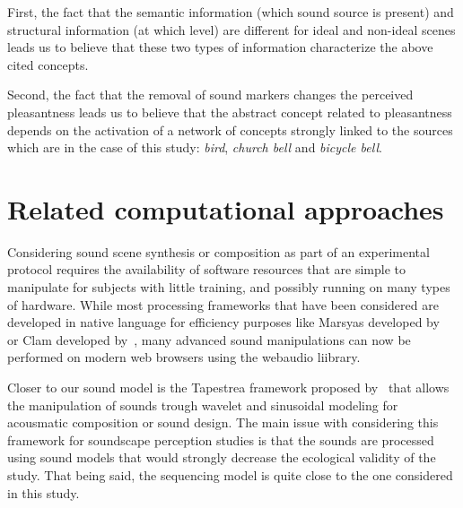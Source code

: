\documentclass[12pt]{elsarticle}
\newcommand{\eg}{\emph{e.\,g.}}
\begin{document}

First, the fact that the semantic information (which sound source is present) and structural information (at which level) are different for ideal and non-ideal scenes leads us to believe that these two types of information characterize the above cited concepts.


Second, the fact that the removal of sound markers changes the perceived pleasantness leads us to believe that the abstract concept related to pleasantness depends on the activation of a network of concepts strongly linked to the sources which are in the case of this study: \emph{bird}, \emph{church bell} and \emph{bicycle bell}.


\section{Related computational approaches}

Considering sound scene synthesis or composition as part of an experimental protocol requires the availability of software resources that are simple to manipulate for subjects with little training, and possibly running on many types of hardware. While most processing frameworks that have been considered are developed in native language for efficiency purposes like Marsyas developed by~\cite{tzanetakis2000marsyas} or Clam developed by~\cite{amatriain2006clam}, many advanced sound manipulations can now be performed on modern web browsers using the webaudio liibrary.

Closer to our sound model is the Tapestrea framework proposed by~\cite{misra2007musical} that allows the manipulation of sounds trough wavelet and sinusoidal modeling for acousmatic composition or sound
design. The main issue with considering this framework for soundscape perception studies is that the sounds are processed using sound models that would strongly decrease the ecological validity of the study. That being said, the sequencing model is quite close to the one considered in this study.
\end{document}

